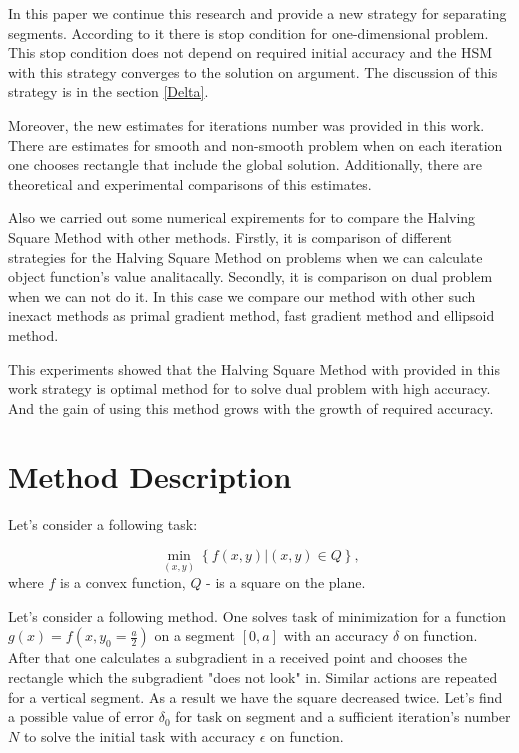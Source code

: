\documentclass[12pt]{article}
\begin{document}
In this paper we continue this research and provide a new strategy for separating segments. According to it there is stop condition for one-dimensional problem. This stop condition does not depend on required initial accuracy and the HSM with this strategy converges to the solution on argument. The discussion of this strategy is in the section \ref{Delta}.

Moreover, the new estimates for iterations number was provided in this work. There are estimates for smooth and non-smooth problem when on each iteration one chooses rectangle that include the global solution. Additionally, there are theoretical and experimental comparisons of this estimates.

Also we carried out some numerical expirements for to compare the Halving Square Method with other methods. Firstly, it is comparison of different strategies for the Halving Square Method on problems when we can calculate object function's value analitacally. Secondly, it is comparison on dual problem when we can not do it. In this case we compare our method with other such inexact methods as primal gradient method, fast gradient method and ellipsoid method.

This experiments showed that the Halving Square Method with provided in this work strategy is optimal method for to solve dual problem with high accuracy. And the gain of using this method grows with the growth of required accuracy.

\section{Method Description}

Let's consider a following task:

$$\min_{(x,y)}\left\{f(x,y)|(x,y) \in Q\right\},$$
where $f$ is a convex function, $Q$ - is a square on the plane.

Let's consider a following method. One solves task of minimization for a function $g(x) = f\left(x, y_0 = \frac{a}{2}\right)$ on a segment $[0, a]$ with an accuracy $\delta$ on function. After that one calculates a subgradient in a received point and chooses the rectangle which the subgradient "does not look" in. Similar actions are repeated for a vertical segment. As a result we have the square decreased twice. Let's find a possible value of error $\delta_0$ for task on segment and a sufficient iteration's number $N$ to solve the initial task with accuracy $\epsilon$ on function.
\end{document}
